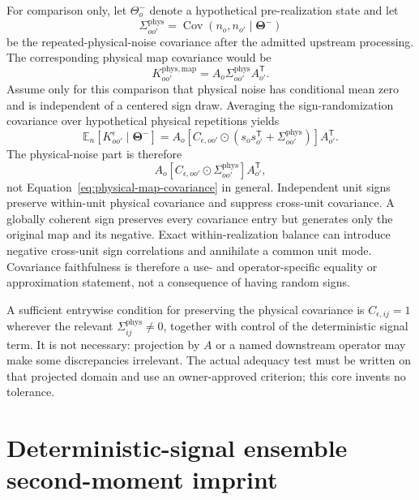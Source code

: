 \documentclass[11pt]{article}
\newcommand{\E}{\mathbb{E}}
\newcommand{\Cov}{\operatorname{Cov}}
\newcommand{\ThetaV}{\boldsymbol{\Theta}}
\begin{document}
For comparison only, let $\Theta_o^-$ denote a hypothetical pre-realization
state and let
\begin{equation}
  \Sigma^{\mathrm{phys}}_{oo'}
  =\Cov(n_o,n_{o'}\mid\ThetaV^-)
  \label{eq:physical-noise-covariance}
\end{equation}
be the repeated-physical-noise covariance after the admitted upstream
processing.  The corresponding physical map covariance would be
\begin{equation}
  K^{\mathrm{phys,map}}_{oo'}
  =A_o\Sigma^{\mathrm{phys}}_{oo'}A_{o'}^{\mathsf T}.
  \label{eq:physical-map-covariance}
\end{equation}
Assume only for this comparison that physical noise has conditional mean zero
and is independent of a centered sign draw.  Averaging the sign-randomization
covariance over hypothetical physical repetitions yields
\begin{equation}
  \E_n[K_{oo'}^\epsilon\mid\ThetaV^-]
  =A_o\!\left[
    C_{\epsilon,oo'}\odot
    \left(s_os_{o'}^{\mathsf T}+\Sigma^{\mathrm{phys}}_{oo'}\right)
  \right]A_{o'}^{\mathsf T}.
  \label{eq:average-randomization-covariance}
\end{equation}
The physical-noise part is therefore
\begin{equation}
  A_o[C_{\epsilon,oo'}\odot
  \Sigma^{\mathrm{phys}}_{oo'}]A_{o'}^{\mathsf T},
  \label{eq:preserved-physical-part}
\end{equation}
not Equation~\eqref{eq:physical-map-covariance} in general.  Independent unit
signs preserve within-unit physical covariance and suppress cross-unit
covariance.  A globally coherent sign preserves every covariance entry but
generates only the original map and its negative.  Exact within-realization
balance can introduce negative cross-unit sign correlations and annihilate a
common unit mode.  Covariance faithfulness is therefore a use- and
operator-specific equality or approximation statement, not a consequence of
having random signs.

A sufficient entrywise condition for preserving the physical covariance is
$C_{\epsilon,ij}=1$ wherever the relevant
$\Sigma^{\mathrm{phys}}_{ij}\ne0$, together with control of the deterministic
signal term.  It is not necessary: projection by $A$ or a named downstream
operator may make some discrepancies irrelevant.  The actual adequacy test
must be written on that projected domain and use an owner-approved criterion;
this core invents no tolerance.

\section{Deterministic-signal ensemble second-moment imprint}
\end{document}
